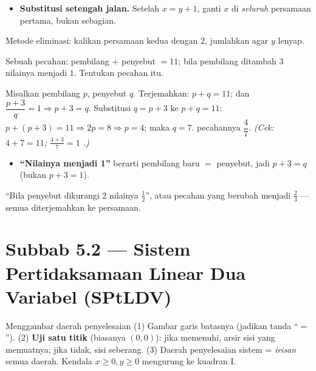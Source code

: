 \begin{jebakan}
\begin{itemize}[leftmargin=*,topsep=2pt]
  \item \textbf{Substitusi setengah jalan.} Setelah $x=y+1$, ganti $x$ di
  \emph{seluruh} persamaan pertama, bukan sebagian.
\end{itemize}
\end{jebakan}

\begin{variasi}
Metode eliminasi: kalikan persamaan kedua dengan $2$, jumlahkan agar $y$ lenyap.
\end{variasi}

\begin{soalbox}{}
Sebuah pecahan: pembilang $+$ penyebut $=11$; bila pembilang ditambah $3$
nilainya menjadi $1$. Tentukan pecahan itu.
\end{soalbox}

\jawab
{} Misalkan pembilang $p$, penyebut $q$. Terjemahkan:
$p+q=11$; dan $\dfrac{p+3}{q}=1\Rightarrow p+3=q$.
 Substitusi $q=p+3$ ke $p+q=11$: $p+(p+3)=11\Rightarrow 2p=8
\Rightarrow p=4$; maka $q=7$.
\jadi pecahannya $\dfrac{4}{7}$.
\emph{(Cek: $4+7=11$; $\frac{4+3}{7}=1$ \checkmark.)}

\begin{jebakan}
\begin{itemize}[leftmargin=*,topsep=2pt]
  \item \textbf{``Nilainya menjadi 1''} berarti pembilang baru $=$ penyebut,
  jadi $p+3=q$ (bukan $p+3=1$).
\end{itemize}
\end{jebakan}

\begin{variasi}
``Bila penyebut dikurangi 2 nilainya $\frac12$'', atau pecahan yang berubah
menjadi $\frac23$ --- semua diterjemahkan ke persamaan.
\end{variasi}

\section*{Subbab 5.2 — Sistem Pertidaksamaan Linear Dua Variabel (SPtLDV)}

\begin{ingat}{Menggambar daerah penyelesaian}
(1) Gambar garis batasnya (jadikan tanda ``$=$''). (2) \textbf{Uji satu titik}
(biasanya $(0,0)$): jika memenuhi, arsir sisi yang memuatnya; jika tidak, sisi
seberang. (3) Daerah penyelesaian sistem = \emph{irisan} semua daerah. Kendala
$x\ge0,y\ge0$ mengurung ke kuadran I.
\end{ingat}

